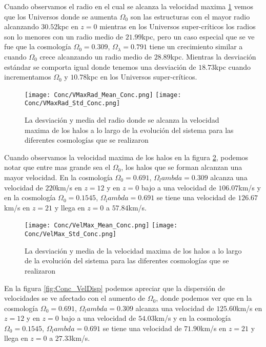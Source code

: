 Cuando observamos el radio en el cual se alcanza la velocidad maxima \ref{fig:Conc_VMaxRad} vemos que los Universos donde se aumenta $\Omega_0$ son las estructuras con el mayor radio alcanzando $30.52$kpc en $z=0$ mientras en los Universos super-críticos los radios son lo menores con un radio medio de $21.99$kpc, pero un caso especial que se ve fue que la cosmología $\Omega_0 =0.309$, $\Omega_\lambda=0.791$ tiene un crecimiento similar a cuando $\Omega_0$ crece alcanzando  un radio medio de $28.89$kpc. Mientras la desviación estándar se comporta igual donde tenemos una desviación de $18.73$kpc cuando incrementamos $\Omega_0$ y $10.78$kpc en los Universos super-críticos.

\begin{figure}[H]
      \centering
      \texttt{[image: Conc/VMaxRad\_Mean\_Conc.png]}
      \texttt{[image: Conc/VMaxRad\_Std\_Conc.png]}
      \caption[Evolución de la desviación y media del radio donde se alcanza la velocidad maxima de los halos para todas las cosmologías]{La desviación y media del radio donde se alcanza la velocidad maxima de los halos a lo largo de la evolución del sistema para las diferentes cosmologías que se realizaron}
      \label{fig:Conc_VMaxRad}
\end{figure}

Cuando observamos la velocidad maxima de los halos en la figura \ref{fig:Conc_VelMax}, podemos notar que entre mas grande sea el $\Omega_0$, los halos que se forman alcanzan una mayor velocidad. En la cosmología $\Omega_0 = 0.691$, $\Omega_lambda = 0.309$ alcanza una velocidad de $220$km/s en $z=12$ y en $z=0$ bajo a una velocidad de $106.07$km/s y en la cosmología  $\Omega_0 = 0.1545$, $\Omega_lambda = 0.691$ se tiene una velocidad de $126.67$km/s en $z=21$ y llega en $z=0$ a $57.84$km/s.

\begin{figure}[H]
      \centering
      \texttt{[image: Conc/VelMax\_Mean\_Conc.png]}
      \texttt{[image: Conc/VelMax\_Std\_Conc.png]}
      \caption[Evolución de la desviación y media de la velocidad maxima de los halos para todas las cosmologías]{La desviación y media de la velocidad maxima de los halos a lo largo de la evolución del sistema para las diferentes cosmologías que se realizaron}
      \label{fig:Conc_VelMax}
\end{figure}

En la figura \ref{fig:Conc_VelDisp} podemos apreciar que la dispersión de velocidades se ve afectado con el aumento de $\Omega_0$, donde podemos ver que en la cosmología $\Omega_0 = 0.691$, $\Omega_lambda = 0.309$ alcanza una velocidad de $125.60$km/s en $z=12$ y en $z=0$ bajo a una velocidad de $54.03$km/s y en la cosmología  $\Omega_0 = 0.1545$, $\Omega_lambda = 0.691$ se tiene una velocidad de $71.90$km/s en $z=21$ y llega en $z=0$ a $27.33$km/s. 

